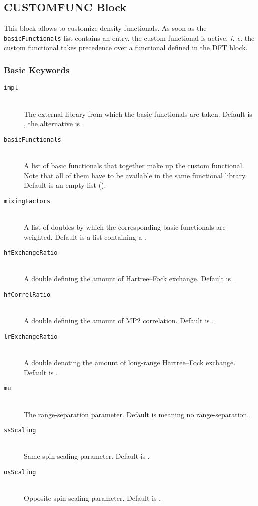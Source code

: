 \subsection{CUSTOMFUNC Block}\label{sec:system:customfunc}
This block allows to customize density functionals. As soon as the \texttt{basicFunctionals} list contains an entry, the custom functional is active, \textit{i. e.}
the custom functional takes precedence over a functional defined in the DFT block.

\subsubsection{Basic Keywords}
\begin{description}
  \item [\texttt{impl}]\hfill \\
  The external library from which the basic functionals are taken. Default is , the alternative is .
  \item [\texttt{basicFunctionals}]\hfill \\
  A list of basic functionals that together make up the custom functional. Note that all of them have to be available in the same functional library. Default is an empty list (\ttt{\{\}}).
  \item [\texttt{mixingFactors}]\hfill \\
  A list of doubles by which the corresponding basic functionals are weighted. Default is a list containing a .
  \item [\texttt{hfExchangeRatio}]\hfill \\
  A double defining the amount of Hartree--Fock exchange. Default is .
  \item [\texttt{hfCorrelRatio}]\hfill \\
  A double defining the amount of MP2 correlation. Default is .
  \item [\texttt{lrExchangeRatio}]\hfill \\
  A double denoting the amount of long-range Hartree--Fock exchange. Default is .
  \item [\texttt{mu}]\hfill \\
  The range-separation parameter. Default is  meaning no range-separation.
  \item [\texttt{ssScaling}]\hfill \\
  Same-spin scaling parameter. Default is .
  \item [\texttt{osScaling}]\hfill \\
  Opposite-spin scaling parameter. Default is .
\end{description}


